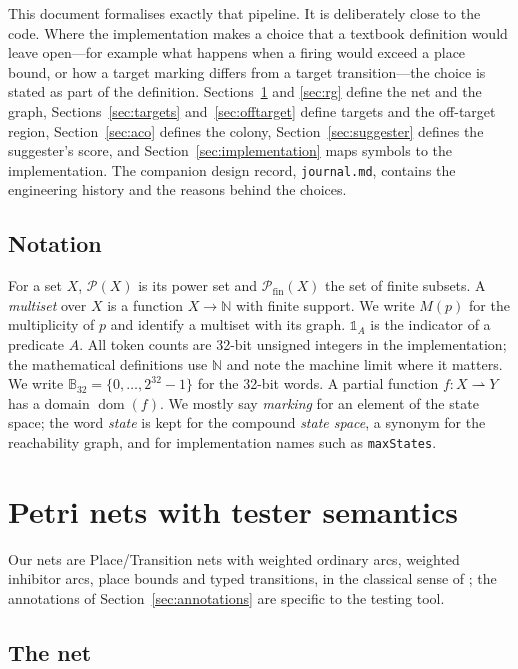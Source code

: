 \documentclass[11pt,a4paper]{article}
\newcommand{\N}{\mathbb{N}}
\newcommand{\Pow}{\mathcal{P}}
\newcommand{\B}{\mathbb{B}_{32}}
\begin{document}
This document formalises exactly that pipeline.  It is deliberately close to
the code.  Where the implementation makes a choice that a textbook definition
would leave open---for example what happens when a firing would exceed a place
bound, or how a target marking differs from a target transition---the choice
is stated as part of the definition.  Sections~\ref{sec:nets} and
\ref{sec:rg} define the net and the graph, Sections~\ref{sec:targets}
and~\ref{sec:offtarget} define targets and the off-target region,
Section~\ref{sec:aco} defines the colony, Section~\ref{sec:suggester} defines
the suggester's score, and
Section~\ref{sec:implementation} maps symbols to the implementation.
The companion design record, \texttt{journal.md}, contains the engineering
history and the reasons behind the choices.

\subsection{Notation}

For a set $X$, $\Pow(X)$ is its power set and $\Pow_{\mathrm{fin}}(X)$ the set
of finite subsets.  A \emph{multiset} over $X$ is a function $X\to\N$ with
finite support.  We write $M(p)$ for the multiplicity of $p$ and identify a
multiset with its graph.  $\mathbb{1}_{A}$ is the indicator of a predicate
$A$.  All token counts are 32-bit unsigned integers in the implementation;
the mathematical definitions use $\N$ and note the machine limit where it
matters.  We write $\B=\{0,\dots,2^{32}-1\}$ for the 32-bit words.  A partial
function $f\colon X\rightharpoonup Y$ has a domain
$\operatorname{dom}(f)$.  We mostly say \emph{marking} for an element of the
state space; the word \emph{state} is kept for the compound \emph{state space},
a synonym for the reachability graph, and for implementation names such as
\texttt{maxStates}.

\section{Petri nets with tester semantics}\label{sec:nets}

Our nets are Place/Transition nets with weighted ordinary arcs, weighted
inhibitor arcs, place bounds and typed transitions, in the classical sense of
\cite{murata1989petri}; the annotations of Section~\ref{sec:annotations} are
specific to the testing tool.

\subsection{The net}
\end{document}
